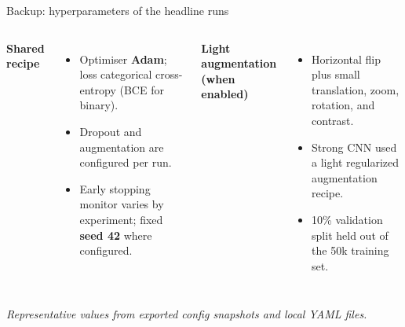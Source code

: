 \documentclass[aspectratio=169,11pt]{beamer}
\newcommand{\source}[1]{{\footnotesize\itshape\textcolor{softgrey}{#1}}}
\begin{document}
\begin{frame}{Backup: hyperparameters of the headline runs}
  \vfill
  \begin{columns}[T,onlytextwidth]
      \textbf{Shared recipe}
      \begin{itemize}
        \item Optimiser \textbf{Adam}; loss categorical cross-entropy (BCE for binary).
        \item Dropout and augmentation are configured per run.
        \item Early stopping monitor varies by experiment; fixed \textbf{seed 42} where configured.
      \end{itemize}
      \textbf{Light augmentation (when enabled)}
      \begin{itemize}
        \item Horizontal flip plus small translation, zoom, rotation, and contrast.
        \item Strong CNN used a light regularized augmentation recipe.
        \item 10\% validation split held out of the 50k training set.
      \end{itemize}
  \end{columns}
  \vfill
  \source{Representative values from exported config snapshots and local YAML files.}
\end{frame}
\end{document}

